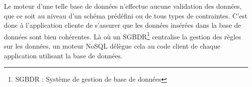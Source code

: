 	Le moteur d'une telle base de données n'effectue aucune validation des données, que ce soit au niveau d'un schéma prédéfini ou de tous types de contraintes. C'est donc à l'application cliente de s'assurer que les données insérées dans la base de données sont bien cohérentes. Là où un SGBDR\footnote{SGBDR : Système de gestion de base de données} centralise la gestion des règles sur les données, un moteur NoSQL délègue cela au code client de chaque application utilisant la base de données.